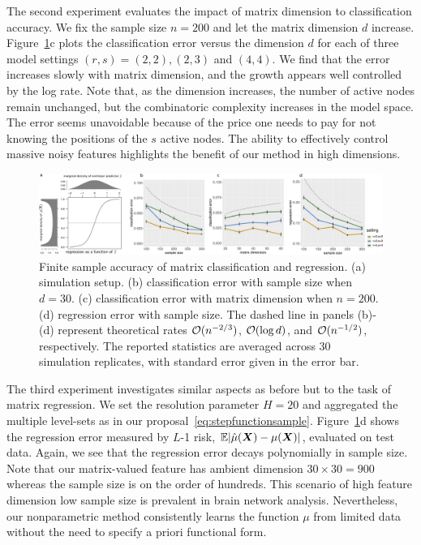 \documentclass[11pt]{article}
\theoremstyle{plain}
\theoremstyle{definition}
\begin{document}
The second experiment evaluates the impact of matrix dimension to classification accuracy. We fix the sample size $n=200$ and let the matrix dimension $d$ increase. Figure~\ref{fig:logistic}c plots the classification error versus the dimension $d$ for each of three model settings $(r,s)=(2,2), (2,3)$ and $(4,4)$. We find that the error increases slowly with matrix dimension, and the growth appears well controlled by the log rate. Note that, as the dimension increases, the number of active nodes remain unchanged, but the combinatoric complexity increases in the model space. The error seems unavoidable because of the price one needs to pay for not knowing the positions of the $s$ active nodes. The ability to effectively control massive noisy features highlights the benefit of our method in high dimensions. 

\begin{figure}[ht]
    \centering
    \includegraphics[width=\textwidth]{combined_logistic.pdf}
    \caption{Finite sample accuracy of matrix classification and regression. (a) simulation setup. (b) classification error with sample size when $d=30$. (c) classification error with matrix dimension when $n=200$. (d) regression error with sample size. The dashed line in panels (b)-(d) represent theoretical rates $\mathcal{O}(n^{-2/3})$, $\mathcal{O}(\log d)$, and $\mathcal{O}(n^{-1/2})$, respectively. The reported statistics are averaged across 30 simulation replicates, with standard error given in the error bar.}\label{fig:logistic}
\end{figure}

The third experiment investigates similar aspects as before but to the task of matrix regression. We set the resolution parameter $H=20$ and aggregated the multiple level-sets as in our proposal~\eqref{eq:stepfunctionsample}. Figure~\ref{fig:logistic}d shows the regression error measured by $L$-1 risk, $\mathbb{E}|\hat \mu (\bm X)- \mu(\bm X)|$, evaluated on test data. Again, we see that the regression error decays polynomially in sample size. Note that our matrix-valued feature has ambient dimension $30\times 30=900$ whereas the sample size is on the order of hundreds. This scenario of high feature dimension low sample size is prevalent in brain network analysis. Nevertheless, our nonparametric method consistently learns the function $\mu$ from limited data without the need to specify a priori functional form.
\end{document}
